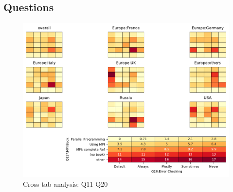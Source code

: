 
\subsection{Questions}


\begin{figure}
\begin{center}
\includegraphics[width=12cm]{../pdfs/Q11-Q20.pdf}
\caption{Cross-tab analysis: Q11-Q20}
\label{fig:Q11-Q20}
\end{center}
\end{figure}
